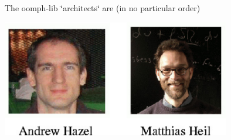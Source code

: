 The {\ttfamily oomph-\/lib} \char`\"{}architects\char`\"{} are (in no particular order)

 
\begin{DoxyImageNoCaption}
  \mbox{\includegraphics[width=0.75\textwidth]{architects}}
\end{DoxyImageNoCaption}


